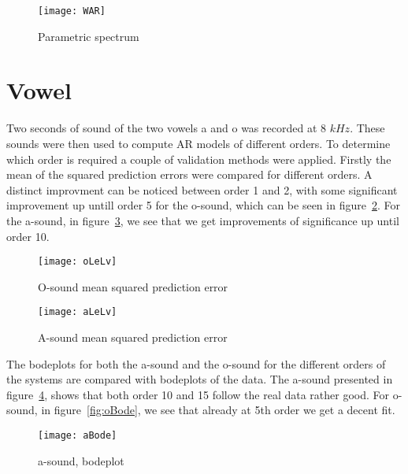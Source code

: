 \documentclass[10pt]{article}
\begin{document}
\begin{figure}[!hp]

    \begin{center}
      \texttt{[image: WAR]}
    \caption{Parametric spectrum \label{fig:WAR}}
    \end{center}

\end{figure}


\section{Vowel}
Two seconds of sound of the two vowels a and o was recorded at
8 $kHz$. These sounds were then used to compute AR models of
different orders. To determine which order is required a couple of validation
methods were applied. Firstly the mean of the squared prediction errors were compared for different
orders. A distinct improvment can be noticed between order 1 and 2, with some
significant improvement up untill order 5 for the o-sound, which can be seen in
figure~\ref{fig:oLeLv}. For the a-sound, in figure~\ref{fig:aLeLv}, we see that
 we get improvements of significance up until order 10.


\begin{figure}[!hp]

    \begin{center}
      \texttt{[image: oLeLv]}
    \caption{O-sound mean squared prediction error \label{fig:oLeLv}}
    \end{center}

\end{figure}

\begin{figure}[!hp]

    \begin{center}
      \texttt{[image: aLeLv]}
    \caption{A-sound mean squared prediction error \label{fig:aLeLv}}
    \end{center}

\end{figure}

The bodeplots for both the a-sound and the o-sound for the different orders of
the systems are compared with bodeplots of the data. The a-sound presented in
figure~\ref{fig:aBode}, shows that both order 10 and 15 follow the real data
rather good. For o-sound, in figure~\ref{fig:oBode}, we see that already at
5th order we get a decent fit.


\begin{figure}[!hp]

    \begin{center}
      \texttt{[image: aBode]}
    \caption{a-sound, bodeplot \label{fig:aBode}}
    \end{center}

\end{figure}
\end{document}
